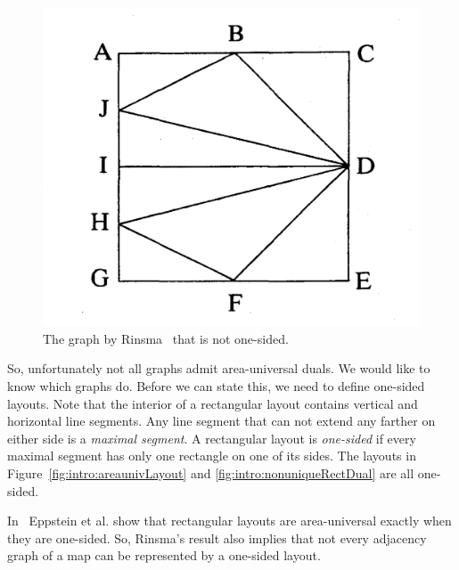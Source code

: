   \begin{figure}  %
    \centering
    \includegraphics[scale=.16]{introduction/img/rinsma.png}
    \caption{The graph by Rinsma~\cite{Rinsma1987} that is not one-sided.}
    \label{fig:intro:rinsma}
  \end{figure}

  So, unfortunately not all graphs admit area-universal duals.
  We would like to know which graphs do.
  Before we can state this, we need to define one-sided layouts.
  Note that the interior of a rectangular layout contains vertical and horizontal line segments.
  Any line segment that can not extend any farther on either side is a \emph{maximal segment}.
  A rectangular layout is \emph{one-sided} if every maximal segment has only one rectangle on one of its sides.
  The layouts in Figure~\ref{fig:intro:areaunivLayout} and  \ref{fig:intro:nonuniqueRectDual} are all one-sided.

  In~\cite{Eppstein2012} Eppstein et al. show that rectangular layouts are area-universal exactly when they are one-sided.
  So, Rinsma's result also implies that not every adjacency graph of a map can be represented by a one-sided layout.


